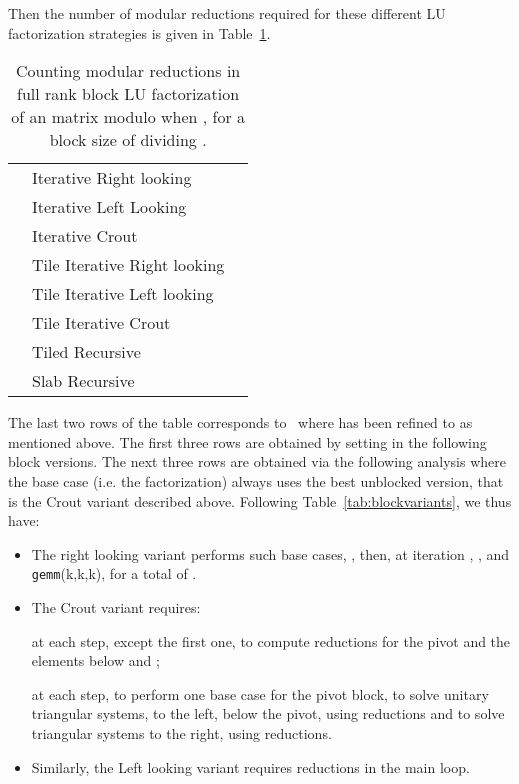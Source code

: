 \documentclass{article}
\newcommand{\gemm}{\texttt{gemm}\xspace}
\begin{document}
Then the number of modular reductions required for these different LU
factorization strategies is given in Table~\ref{tab:modcount}.
\begin{table}[ht]
\renewcommand{\arraystretch}{1.5}
\center 
\begin{tabular}{clc}
\toprule
\multirow{3}{*}{\begin{sideways}\end{sideways}} 
& Iterative Right looking &  \\
& Iterative Left Looking & \\
& Iterative Crout & \\
\midrule
\multirow{3}{*}{\begin{sideways}\end{sideways}} 
& Tile Iterative Right looking &  \\
& Tile Iterative Left looking & \\
& Tile Iterative Crout & \\
\midrule
& Tiled Recursive & \\
\midrule
& Slab Recursive & \\
\bottomrule
\end{tabular}
\vspace{5pt}
\caption{Counting modular reductions in full rank block LU
  factorization of an  matrix modulo  when ,
  for a block size of  dividing .}\label{tab:modcount}
\vspace{-10pt}
\end{table}
 
 
 
 
 
The last two rows of the table corresponds
to~\cite[Theorem~4]{DPS13} where  has been refined to  as mentioned above.
The first three rows are obtained by setting  in the following block
versions. 
The next three rows are obtained via the following analysis
where the base case (i.e. the  factorization) always uses the best
unblocked version, that is the Crout variant described above.
Following Table~\ref{tab:blockvariants}, we thus have:
\begin{itemize}
\item The right looking variant performs  such  base cases,
  , then, at iteration , ,
  and  \gemm(k,k,k), for a total of
  .
\item The Crout variant requires:
 
 
      at each step, except the first one, to compute 
      reductions for the pivot and the elements below and
      ;
 
      at each step, to perform one base case for the pivot block, to
      solve unitary triangular systems, to the left, below the pivot, using
       reductions and to solve triangular systems to the
      right, using  reductions. 
 
\item Similarly, the Left looking variant requires  reductions in the main loop.
\end{itemize}
 
\end{document}

